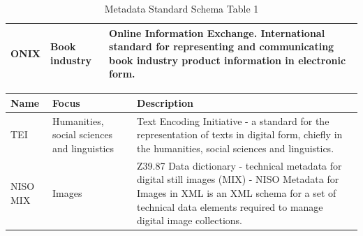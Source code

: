 \documentclass[epsfig,a4paper,12pt,titlepage]{book}
\begin{document}
\begin{table}[H]
\begin{adjustbox}{width=\textwidth}
\begin{tabular}{|p{1.5cm}|p{3.5cm}|p{14.0cm}|}
ONIX & Book industry & Online Information Exchange. International standard for representing and communicating book industry product information in electronic form. \\ \hline


\hline
    \end{tabular}
    \end{adjustbox}
    \caption{Metadata Standard Schema Table 1}
    \label{tab:metadata1}
\end{table}
\begin{table}[h]
\small
    \centering
    \begin{adjustbox}{width=\textwidth}
    \begin{tabular}{|p{1.5cm}|p{3.5cm}|p{14.0cm}|} \hline
    Name & Focus & Description \\ \hline

TEI & Humanities, social sciences and linguistics & Text Encoding Initiative - a standard for the representation of texts in digital form, chiefly in the humanities, social sciences and linguistics. \\ \hline
NISO MIX & Images & Z39.87 Data dictionary - technical metadata for digital still images (MIX) - NISO Metadata for Images in XML is an XML schema for a set of technical data elements required to manage digital image collections. \\ \hline


\end{tabular}
\end{adjustbox}
\end{table}
\end{document}
